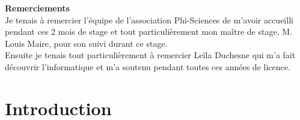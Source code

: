 \documentclass[11pt, twoside]{article}
\begin{document}


{\huge\textbf{Remerciements}}
\vspace*{0.8cm}\\
Je tenais à remercier l'équipe de l'association Phi-Sciences de m'avoir accueilli pendant ces 2 mois de stage et tout particulièrement mon maître de stage, M. Louis Maire, pour son suivi durant ce stage.
\vspace*{0.3cm}\\
Ensuite je tenais tout particulièrement à remercier Leïla Duchesne qui m'a fait découvrir l'informatique et m'a soutenu pendant toutes ces années de licence.
\newpage

\tableofcontents
\newpage

\section{Introduction}
\end{document}
